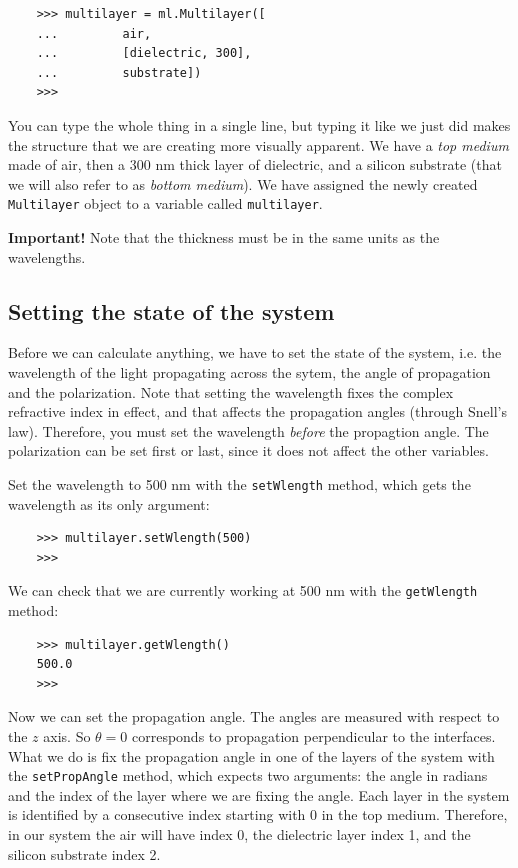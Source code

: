 \documentclass[a4paper,11pt,aps,final]{revtex4}
\begin{document}
\begin{verbatim}
    >>> multilayer = ml.Multilayer([
    ...         air,
    ...         [dielectric, 300],
    ...         substrate])
    >>>
\end{verbatim}

You can type the whole thing in a single line, but typing it like we just did makes the structure that we are creating more visually apparent. We have a \emph{top medium} made of air, then a 300 nm thick layer of dielectric, and a silicon substrate (that we will also refer to as \emph{bottom medium}). We have assigned the newly created \texttt{Multilayer} object to a variable called \texttt{multilayer}.

\textbf{Important!} Note that the thickness must be in the same units as the wavelengths.

\subsection{Setting the state of the system}

Before we can calculate anything, we have to set the state of the system, i.e. the wavelength of the light propagating across the sytem, the angle of propagation and the polarization. Note that setting the wavelength fixes the complex refractive index in effect, and that affects the propagation angles (through Snell's law). Therefore, you must set the wavelength \emph{before} the propagtion angle. The polarization can be set first or last, since it does not affect the other variables.

Set the wavelength to 500 nm with the \texttt{setWlength} method, which gets the wavelength as its only argument:

\begin{verbatim}
    >>> multilayer.setWlength(500)
    >>>
\end{verbatim}

We can check that we are currently working at 500 nm with the \texttt{getWlength} method:

\begin{verbatim}
    >>> multilayer.getWlength()
    500.0
    >>>
\end{verbatim}


Now we can set the propagation angle. The angles are measured with respect to the $z$ axis. So $\theta = 0$ corresponds to propagation perpendicular to the interfaces. What we do is fix the propagation angle in one of the layers of the system with the \texttt{setPropAngle} method, which expects two arguments: the angle in radians and the index of the layer where we are fixing the angle. Each layer in the system is identified by a consecutive index starting with 0 in the top medium. Therefore, in our system the air will have index 0, the dielectric layer index 1, and the silicon substrate index 2.
\end{document}
